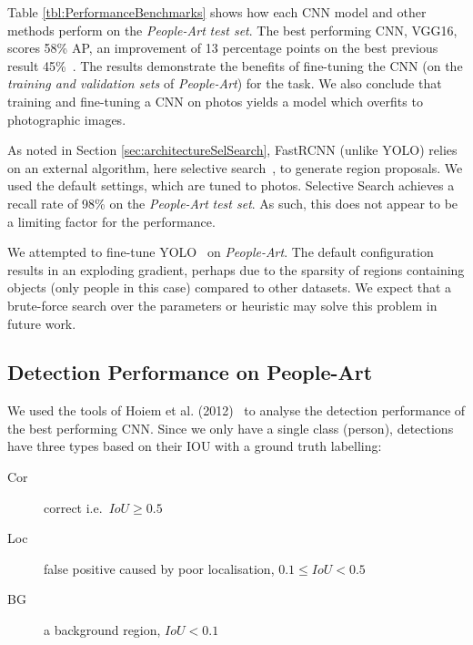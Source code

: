 \documentclass[runningheads]{llncs}
\begin{document}
Table \ref{tbl:PerformanceBenchmarks} shows how each \ac{CNN} model and other methods perform on the \textit{People-Art} \textit{test set}.
The best performing \ac{CNN}, VGG16, scores 58\% \ac{AP}, an improvement of 13 percentage points on the best previous result 45\%~\cite{redmon2015you}.
The results demonstrate the benefits of fine-tuning the \ac{CNN} (on the \textit{training and validation sets} of \textit{People-Art}) for the task.
We also conclude that training and fine-tuning a \ac{CNN} on \acp{photo} yields a model which overfits to photographic images.

As noted in Section \ref{sec:architectureSelSearch}, \ac{FastRCNN} (unlike \ac{YOLO}) relies on an external algorithm, here selective search~\cite{uijlings2013selective}, to generate region proposals.
We used the default settings, which are tuned to \acp{photo}.
Selective Search achieves a recall rate of 98\%  on the \textit{People-Art} \textit{test set}.
As such, this does not appear to be a limiting factor for the performance.

We attempted to fine-tune \ac{YOLO}~\cite{redmon2015you} on \textit{People-Art}.
The default configuration results in an exploding gradient, perhaps due to the sparsity of regions containing objects (only people in this case) compared to other datasets.
We expect that a brute-force search over the parameters or heuristic may solve this problem in future work.

\subsection{Detection Performance on People-Art}
We used the tools of Hoiem et al. (2012)~\cite{hoiem2012diagnosing} to analyse the detection performance of the best performing \ac{CNN}.
Since we only have a single class (person), detections have three types based on their \ac{IOU} with a ground truth labelling:
\begin{description}
\item[Cor] correct i.e.\
\begin{math}
  IoU \geq 0.5
\end{math}
\item[Loc] false positive caused by poor localisation, 
\begin{math}
  0.1 \leq IoU < 0.5
\end{math}
\item[BG] a background region,
\begin{math}
  IoU < 0.1
\end{math}
\end{description}
\end{document}
